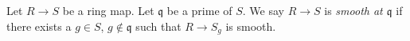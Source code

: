 \begin{definition}
\label{definition-smooth-at-prime}
Let $R \to S$ be a ring map.
Let $\mathfrak q$ be a prime of $S$.
We say $R \to S$ is {\it smooth at $\mathfrak q$} if there
exists a $g \in S$, $g \not \in \mathfrak q$ such
that $R \to S_g$ is smooth.
\end{definition}